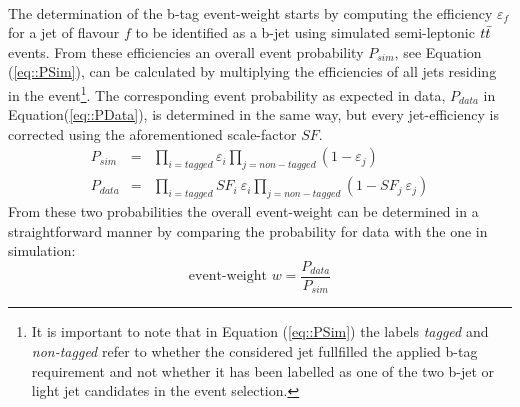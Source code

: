 \\
The determination of the b-tag event-weight starts by computing the efficiency $\varepsilon_{f}$ for a jet of flavour $f$ to be identified as a b-jet using simulated semi-leptonic $t\bar{t}$ events.
From these efficiencies an overall event probability $P_{sim}$, see Equation (\ref{eq::PSim}), can be calculated by multiplying the efficiencies of all jets residing in the event\footnote{It is important to note that in Equation (\ref{eq::PSim}) the labels \textit{tagged} and \textit{non-tagged} refer to whether the considered jet fullfilled the applied b-tag requirement and not whether it has been labelled as one of the two b-jet or light jet candidates in the event selection.}.
The corresponding event probability as expected in data, $P_{data}$ in Equation(\ref{eq::PData}), is determined in the same way, but every jet-efficiency is corrected using the aforementioned scale-factor $SF$.
\begin{eqnarray} 
 P_{sim} & = & \prod_{i = tagged} \varepsilon_{i} \prod_{j = non-tagged} (1-\varepsilon_{j})  \label{eq::PSim} \\
 P_{data} & = & \prod_{i = tagged} SF_{i} ~ \varepsilon_{i} \prod_{j = non-tagged} (1- SF_{j} ~ \varepsilon_{j}) \label{eq::PData}
\end{eqnarray}
From these two probabilities the overall event-weight can be determined in a straightforward manner by comparing the probability for data with the one in simulation:
\begin{equation}
 \textrm{event-weight } w = \dfrac{P_{data}}{P_{sim}}
\end{equation}

